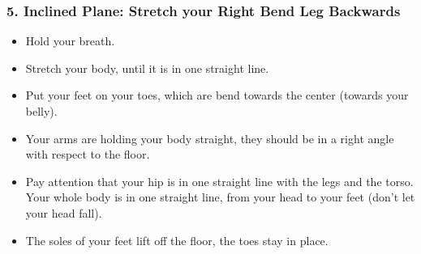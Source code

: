 \documentclass[../Book.Stress_regulation.tex]{subfiles}
\begin{document}
\subsubsection{5. Inclined Plane: Stretch your Right Bend Leg Backwards}
\begin{itemize}
\item Hold your breath.
\item Stretch your body, until it is in one straight line.
\item Put your feet on your toes, which are bend towards the center (towards your belly).
\item Your arms are holding your body straight, they should be in a right angle with respect to the floor.
\item Pay attention that your hip is in one straight line with the legs and the torso.
  Your whole body is in one straight line, from your head to your feet (don't let your head fall).
\item The soles of your feet lift off the floor, the toes stay in place.
\end{itemize}
\end{document}
